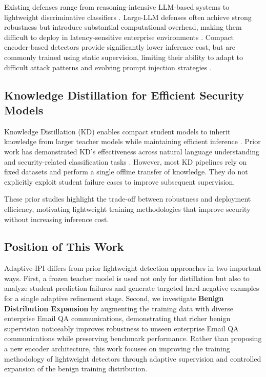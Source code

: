 \documentclass[conference]{IEEEtran}
\begin{document}
Existing defenses range from reasoning-intensive LLM-based systems to lightweight discriminative
classifiers \cite{ref1, ref2}. Large-LLM defenses often achieve strong robustness but introduce
substantial computational overhead, making them difficult to deploy in latency-sensitive enterprise
environments \cite{ref4, ref6}. Compact encoder-based detectors provide significantly lower
inference cost, but are commonly trained using static supervision, limiting their ability to adapt
to difficult attack patterns and evolving prompt injection strategies \cite{ref5, ref7}.

\subsection{Knowledge Distillation for Efficient Security Models}

Knowledge Distillation (KD) enables compact student models to inherit knowledge from larger teacher
models while maintaining efficient inference \cite{ref3}. Prior work has demonstrated KD's
effectiveness across natural language understanding and security-related classification tasks
\cite{ref3}. However, most KD pipelines rely on fixed datasets and perform a single offline transfer
of knowledge. They do not explicitly exploit student failure cases to improve subsequent
supervision.

These prior studies highlight the trade-off between robustness and deployment efficiency, motivating
lightweight training methodologies that improve security without increasing inference cost.

\subsection{Position of This Work}

Adaptive-IPI differs from prior lightweight detection approaches in two important ways. First, a
frozen teacher model is used not only for distillation but also to analyze student prediction
failures and generate targeted hard-negative examples for a single adaptive refinement stage.
Second, we investigate \textbf{Benign Distribution Expansion} by augmenting the training data with
diverse enterprise Email QA communications, demonstrating that richer benign supervision noticeably
improves robustness to unseen enterprise Email QA communications while preserving benchmark
performance. Rather than proposing a new encoder architecture, this work focuses on improving the
training methodology of lightweight detectors through adaptive supervision and controlled expansion
of the benign training distribution.
\end{document}
